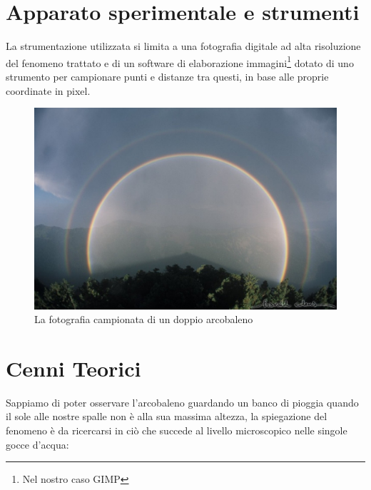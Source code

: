 \documentclass{report}[a4paper,11pt]
\begin{document}
\section{Apparato sperimentale e strumenti}
La strumentazione utilizzata si limita a una fotografia digitale ad alta risoluzione del fenomeno trattato e di un software di elaborazione immagini\footnote{Nel nostro caso GIMP\cite{gimp}} dotato di uno strumento per campionare punti e distanze tra questi, in base alle proprie coordinate in pixel.
\begin{figure}[htb!]
  \begin{center}
    \includegraphics[width=\linewidth]{./figs/double-rainbow.jpg}
  \end{center}
  \caption{La fotografia campionata di un doppio arcobaleno}
\end{figure}

\section{Cenni Teorici}
Sappiamo di poter osservare l'arcobaleno guardando un banco di pioggia quando il sole alle nostre spalle non è alla sua massima altezza, la spiegazione del fenomeno è da ricercarsi in ciò che succede al livello microscopico nelle singole gocce d'acqua:
\end{document}
